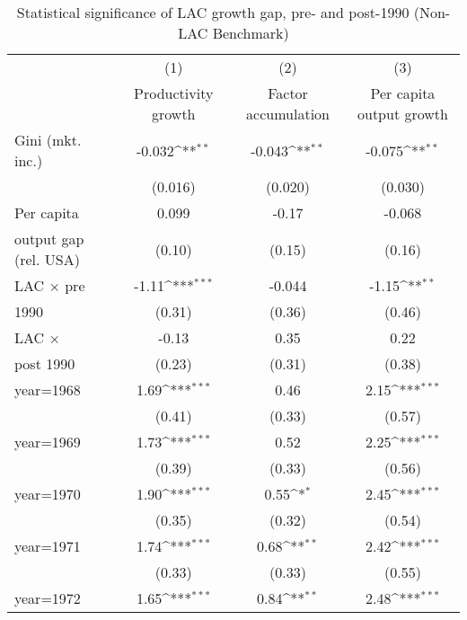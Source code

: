 \begin{sidewaystable}[htbp]\centering
\def\sym#1{\ifmmode^{#1}\else\(^{#1}\)\fi}
\caption{Statistical significance of LAC growth gap, pre- and post-1990 (Non-LAC Benchmark)}
\begin{tabular}{l*{3}{c}}
\toprule
                &\multicolumn{1}{c}{(1)}&\multicolumn{1}{c}{(2)}&\multicolumn{1}{c}{(3)}\\
                &\multicolumn{1}{c}{Productivity growth}&\multicolumn{1}{c}{Factor accumulation}&\multicolumn{1}{c}{Per capita output growth}\\
\midrule
Gini (mkt. inc.)&   -0.032\sym{**} &   -0.043\sym{**} &   -0.075\sym{**} \\
                &  (0.016)         &  (0.020)         &  (0.030)         \\
\addlinespace
Per capita      &    0.099         &    -0.17         &   -0.068         \\
output gap (rel. USA)&   (0.10)         &   (0.15)         &   (0.16)         \\
\addlinespace
LAC $\times$ pre&    -1.11\sym{***}&   -0.044         &    -1.15\sym{**} \\
1990            &   (0.31)         &   (0.36)         &   (0.46)         \\
\addlinespace
LAC $\times$    &    -0.13         &     0.35         &     0.22         \\
post 1990       &   (0.23)         &   (0.31)         &   (0.38)         \\
\addlinespace
year=1968       &     1.69\sym{***}&     0.46         &     2.15\sym{***}\\
                &   (0.41)         &   (0.33)         &   (0.57)         \\
\addlinespace
year=1969       &     1.73\sym{***}&     0.52         &     2.25\sym{***}\\
                &   (0.39)         &   (0.33)         &   (0.56)         \\
\addlinespace
year=1970       &     1.90\sym{***}&     0.55\sym{*}  &     2.45\sym{***}\\
                &   (0.35)         &   (0.32)         &   (0.54)         \\
\addlinespace
year=1971       &     1.74\sym{***}&     0.68\sym{**} &     2.42\sym{***}\\
                &   (0.33)         &   (0.33)         &   (0.55)         \\
\addlinespace
year=1972       &     1.65\sym{***}&     0.84\sym{**} &     2.48\sym{***}\\

\end{tabular}
\end{sidewaystable}
